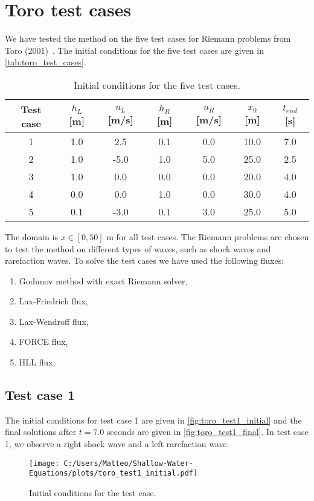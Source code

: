 \section{Toro test cases}
We have tested the method on the five test cases for Riemann problems from Toro (2001)~\cite{Toro2001-Shock}.
The initial conditions for the five test cases are given in \autoref{tab:toro_test_cases}.
\begin{table}[H]
    \centering
    \begin{tabular}{c|c|c|c|c|c|c}
        \hline
        \textbf{Test case} & \textbf{$h_L$} [m] & \textbf{$u_L$} [m/s] & \textbf{$h_R$} [m] & \textbf{$u_R$} [m/s] & \textbf{$x_0$} [m] & \textbf{$t_{end}$} [s] \\
        \hline\hline
        1 & 1.0 & 2.5 & 0.1 & 0.0 & 10.0 & 7.0 \\
        2 & 1.0 & -5.0 & 1.0 & 5.0 & 25.0 & 2.5 \\
        3 & 1.0 & 0.0 & 0.0 & 0.0 & 20.0 & 4.0 \\
        4 & 0.0 & 0.0 & 1.0 & 0.0 & 30.0 & 4.0 \\
        5 & 0.1 & -3.0 & 0.1 & 3.0 & 25.0 & 5.0 \\
        \hline
    \end{tabular}
    \caption{Initial conditions for the five test cases.}\label{tab:toro_test_cases}
\end{table}
The domain is $x \in [0, 50]$ m for all test cases.
The Riemann problems are chosen to test the method on different types of waves, such as shock waves and rarefaction waves.
To solve the test cases we have used the following fluxes:
\begin{enumerate}
    \item Godunov method with exact Riemann solver,
    \item Lax-Friedrich flux,
    \item Lax-Wendroff flux,
    \item FORCE flux,
    \item HLL flux,
\end{enumerate}

\subsection*{Test case 1}
The initial conditions for test case 1 are given in \autoref{fig:toro_test1_initial} and the final solutions after $t=7.0$ seconds are given in \autoref{fig:toro_test1_final}.
In test case 1, we observe a right shock wave and a left rarefaction wave.
\begin{figure}[H]
    \centering
    \texttt{[image: C:/Users/Matteo/Shallow-Water-Equations/plots/toro\_test1\_initial.pdf]}
    \caption{Initial conditions for the test case.}\label{fig:toro_test1_initial}
\end{figure}


